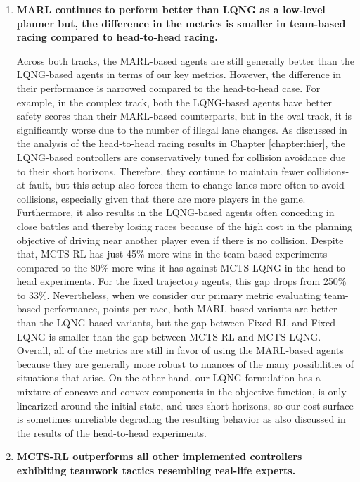 \begin{enumerate}[wide, labelindent=0pt, font=\bfseries]
\item \textbf{MARL continues to perform better than LQNG as a low-level planner but, the difference in the metrics is smaller in team-based racing compared to head-to-head racing.}  

Across both tracks, the MARL-based agents are still generally better than the LQNG-based agents in terms of our key metrics. However, the difference in their performance is narrowed compared to the head-to-head case. For example, in the complex track, both the LQNG-based agents have better safety scores than their MARL-based counterparts, but in the oval track, it is significantly worse due to the number of illegal lane changes. As discussed in the analysis of the head-to-head racing results in Chapter \ref{chapter:hier}, the LQNG-based controllers are conservatively tuned for collision avoidance due to their short horizons. Therefore, they continue to maintain fewer collisions-at-fault, but this setup also forces them to change lanes more often to avoid collisions, especially given that there are more players in the game. Furthermore, it also results in the LQNG-based agents often conceding in close battles and thereby losing races because of the high cost in the planning objective of driving near another player even if there is no collision. Despite that, MCTS-RL has just 45\% more wins in the team-based experiments compared to the 80\% more wins it has against MCTS-LQNG in the head-to-head experiments. For the fixed trajectory agents, this gap drops from 250\% to 33\%. Nevertheless, when we consider our primary metric evaluating team-based performance, points-per-race, both MARL-based variants are better than the LQNG-based variants, but the gap between Fixed-RL and Fixed-LQNG is smaller than the gap between MCTS-RL and MCTS-LQNG. Overall, all of the metrics are still in favor of using the MARL-based agents because they are generally more robust to nuances of the many possibilities of situations that arise. On the other hand, our LQNG formulation has a mixture of concave and convex components in the objective function, is only linearized around the initial state, and uses short horizons, so our cost surface is sometimes unreliable degrading the resulting behavior as also discussed in the results of the head-to-head experiments.

\item \textbf{MCTS-RL outperforms all other implemented controllers exhibiting teamwork tactics resembling real-life experts.}  


\end{enumerate}
